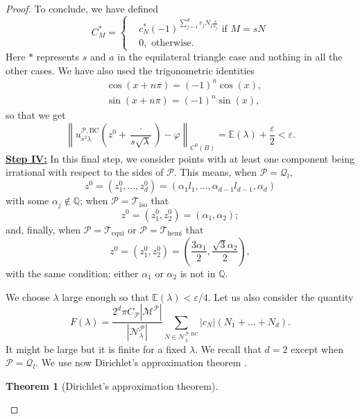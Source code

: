 \documentclass{amsart}
\newtheorem{theorem}{Theorem}[section]
\theoremstyle{definition}
\theoremstyle{remark}
\newcommand{\ep}{\varepsilon}
\newcommand{\vp}{\varphi}
\numberwithin{equation}{section}
\theoremstyle{definition}
\theoremstyle{remark}
\begin{document}
\begin{proof}
	To conclude, we have defined \begin{equation}
		C_{M}^*=\left\{\begin{aligned}
			&c_{N}^*(-1)^{\sum_{j=1}^d r_j N_j\frac{s}{s_j}}\text{ if }M=sN
			\\
			&0, \text{ otherwise.}
		\end{aligned}\right.
	\end{equation}Here $*$ represents $s$ and $a$ in the equilateral triangle case and nothing in all the other cases. We have also used the trigonometric identities \begin{equation}
		\begin{aligned}
			&\cos\left(x+n\pi\right)=(-1)^n\cos\left(x\right),\\
			&\sin\left(x+n\pi\right)=(-1)^n\sin\left(x\right),
		\end{aligned}
	\end{equation}
	so that we get \begin{equation}
		\left\|u_{s^2\lambda}^{\mathcal{P},\mathrm{BC}}\left(z^0+\frac{\cdot}{s\sqrt{\lambda}}\right)-\vp\right\|_{C^0(B)}=\mathbb{E}(\lambda)+\frac{\ep}{2}<\ep.
	\end{equation}
\textbf{	\underline{Step IV:}}  In this final step, we consider points with at least one component being irrational with respect to the sides of $\mathcal{P}$. This means, when $\mathcal{P}=\mathcal{Q}_l$, 
	\begin{equation}
		z^0=\left(z^0_1,\ldots,z^0_d\right)=\left(\alpha_1l_1,\ldots,\alpha_{d-1}l_{d-1},\alpha_d\right)
	\end{equation} with some $\alpha_j\notin\mathbb{Q}$; when $\mathcal{P}=\mathcal{T}_\mathrm{iso}$ that\begin{equation}
		z^0=(z^0_1,z_2^0)=\left(\alpha_1,\alpha_2\right);
	\end{equation} and, finally, when $\mathcal{P}=	\mathcal{T}_\mathrm{equi}$ or $\mathcal{P}=\mathcal{T}_\mathrm{hemi}$ that 
	\begin{equation}
		z^0=(z^0_1,z_2^0)=\left(\frac{3\alpha_1}{2},\frac{\sqrt{3}\alpha_2}{2}\right),
	\end{equation}with the same condition: either $\alpha_1$ or $\alpha_2$ is not in $\mathbb{Q}$.
	
	
	
	We choose $\lambda$ large enough so that $\mathbb{E}(\lambda)<\ep/4$. Let us also consider the quantity \begin{equation}
		F(\lambda)=\frac{2^d\pi C_{\mathcal{P}}|\mathcal{M}^{\mathcal{P}}|}{\left|\mathcal{N}_{\lambda}^{\mathcal{P}}\right|}\sum_{N\in \mathcal{N}_{\lambda}^{\mathcal{P},\mathrm{BC}}}|c_N|\left(N_1+\ldots+N_d\right). 
	\end{equation}It might be large but it is finite for a fixed $\lambda$. We recall that $d=2$ except when $\mathcal{P}=\mathcal{Q}_l$. We use now Dirichlet's approximation theorem \cite[Theorem 1B]{Sch}.
	\begin{theorem}[Dirichlet's approximation theorem]
		

\end{theorem}
\end{proof}
\end{document}

